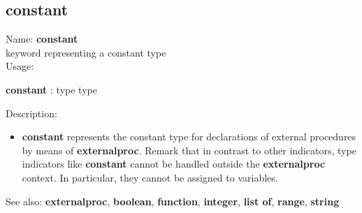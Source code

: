 \subsection{ constant }
\noindent Name: \textbf{constant}\\
keyword representing a \textsf{constant} type \\

\noindent Usage: 
\begin{center}
\textbf{constant} : \textsf{type type}\\
\end{center}
\noindent Description: \begin{itemize}

\item \textbf{constant} represents the \textsf{constant} type for declarations
   of external procedures by means of \textbf{externalproc}.
   Remark that in contrast to other indicators, type indicators like
   \textbf{constant} cannot be handled outside the \textbf{externalproc} context.  In
   particular, they cannot be assigned to variables.
\end{itemize}
See also: \textbf{externalproc}, \textbf{boolean}, \textbf{function}, \textbf{integer}, \textbf{list of}, \textbf{range}, \textbf{string}
